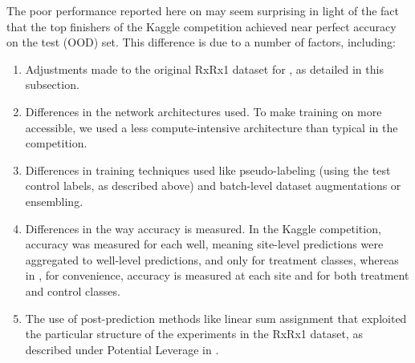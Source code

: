 The poor performance reported here on \RxRx may seem
surprising in light of the fact that the top finishers of the Kaggle
competition achieved near perfect accuracy on the test (OOD) set. This difference is due to a number of factors, including:
\begin{enumerate}
  \item Adjustments made to the original RxRx1 dataset for \RxRx, as detailed in this subsection.
  \item Differences in the network architectures used. To make training on \RxRx more accessible, we used a less compute-intensive architecture than typical in the competition.
  \item Differences in training techniques used like pseudo-labeling (using the test control labels, as described above) and batch-level dataset augmentations or ensembling.
  \item Differences in the way accuracy is measured. In the Kaggle competition, accuracy was measured for each well, meaning site-level predictions were aggregated to well-level predictions, and only for treatment classes, whereas in \RxRx, for convenience, accuracy is measured at each site and for both treatment and control classes.
  \item The use of post-prediction methods like linear sum assignment that exploited the particular structure of the experiments in the RxRx1 dataset, as described under Potential Leverage in .
\end{enumerate}
